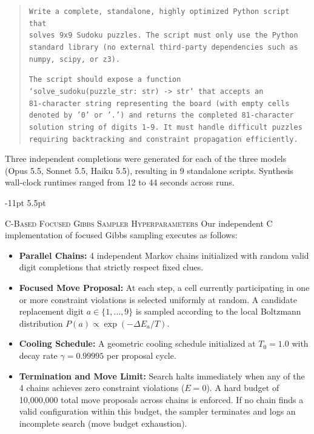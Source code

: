 \documentclass{article} %
\makeatletter
\renewcommand\subsection{\@startsection{subsection}{2}{\z@}%
  {-11pt \@plus -3pt \@minus -2pt}%
  {5.5pt \@plus 2pt}%
  {\normalfont\fontsize{10}{12}\selectfont\scshape\raggedright}}
\makeatother
\begin{document}
\begin{quote}
\small
\texttt{Write a complete, standalone, highly optimized Python script that}\\
\texttt{solves 9x9 Sudoku puzzles. The script must only use the Python}\\
\texttt{standard library (no external third-party dependencies such as}\\
\texttt{numpy, scipy, or z3).}

\medskip
\texttt{The script should expose a function}\\
\texttt{`solve\_sudoku(puzzle\_str: str) -> str` that accepts an}\\
\texttt{81-character string representing the board (with empty cells}\\
\texttt{denoted by '0' or '.') and returns the completed 81-character}\\
\texttt{solution string of digits 1-9. It must handle difficult puzzles}\\
\texttt{requiring backtracking and constraint propagation efficiently.}
\end{quote}

Three independent completions were generated for each of the three models (Opus 5.5, Sonnet 5.5, Haiku 5.5), resulting in 9 standalone scripts. Synthesis wall-clock runtimes ranged from 12 to 44 seconds across runs.

\subsection{\textsc{C-Based Focused Gibbs Sampler Hyperparameters}}
Our independent C implementation of focused Gibbs sampling executes as follows:
\begin{itemize}
    \item \textbf{Parallel Chains:} 4 independent Markov chains initialized with random valid digit completions that strictly respect fixed clues.
    \item \textbf{Focused Move Proposal:} At each step, a cell currently participating in one or more constraint violations is selected uniformly at random. A candidate replacement digit $a \in \{1, \dots, 9\}$ is sampled according to the local Boltzmann distribution $P(a) \propto \exp(-\Delta E_a / T)$.
    \item \textbf{Cooling Schedule:} A geometric cooling schedule initialized at $T_0 = 1.0$ with decay rate $\gamma = 0.99995$ per proposal cycle.
    \item \textbf{Termination and Move Limit:} Search halts immediately when any of the 4 chains achieves zero constraint violations ($E = 0$). A hard budget of 10,000,000 total move proposals across chains is enforced. If no chain finds a valid configuration within this budget, the sampler terminates and logs an incomplete search (move budget exhaustion).
\end{itemize}
\end{document}
